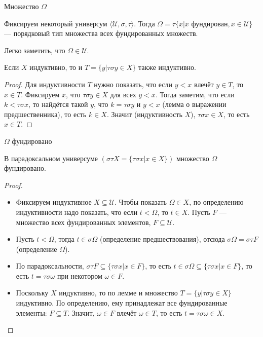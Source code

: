 \documentclass[aspectratio=169,dvipsnames,usenames]{beamer}
\begin{document}
\begin{frame}{Множество $\Omega$}
\begin{dfn} Фиксируем некоторый универсум $\langle\mathcal{U},\sigma,\tau\rangle$. Тогда $\Omega = \tau\{x | x \text{ фундирован}, x\in\mathcal{U}\}$ --- 
порядковый тип множества всех фундированных множеств.
\end{dfn}

Легко заметить, что $\Omega\in\mathcal{U}$.

\begin{lmm}Если $X$ индуктивно, то и $T = \{y | \tau\sigma y \in X\}$ также индуктивно.\end{lmm}
\begin{proof}
Для индуктивности $T$ нужно показать, что если $y < x$ влечёт $y \in T$, то $x \in T$.
Фиксируем $x$, что $\tau\sigma y \in X$ для всех $y < x$.
Тогда заметим, что если $k < \tau\sigma x$, то найдётся такой $y$, что $k = \tau\sigma y$ и $y < x$
(лемма о выражении предшественника), то есть $k \in X$. Значит (индуктивность $X$), $\tau\sigma x \in X$, то есть $x \in T$.
\end{proof}


\end{frame}

\begin{frame}{$\Omega$ фундировано}
\begin{lmm} В парадоксальном универсуме $(\sigma\tau X = \{\tau\sigma x| x \in X\})$ множество $\Omega$ фундировано.
\end{lmm}
\begin{proof}
\begin{itemize}
\item Фиксируем индуктивное $X \subseteq \mathcal{U}$. Чтобы показать $\Omega \in X$, по определению индуктивности надо показать, что если $t < \Omega$, то $t \in X$.
Пусть $F$ --- множество всех фундированных элементов, $F \subseteq \mathcal{U}$.

\item Пусть $t < \Omega$, тогда $t \in \sigma\Omega$ (определение предшествования), 
отсюда $\sigma\Omega = \sigma\tau F$
(определение $\Omega$).

\item По парадоксальности, $\sigma\tau F \subseteq \{\tau\sigma x| x \in F\}$, то есть $t \in \sigma\Omega \subseteq \{\tau\sigma x | x \in F\}$,
то есть $t = \tau\sigma\omega$ при некотором $\omega \in F$.

\item Поскольку $X$ индуктивно, то по лемме и множество $T = \{y | \tau\sigma y \in X\}$ индуктивно. По определению, ему принадлежат все фундированные элементы: $F \subseteq T$.
Значит, $\omega \in F$ влечёт $\omega \in T$, то есть $t = \tau\sigma\omega \in X$.

\end{itemize}
\end{proof}
\end{frame}
\end{document}
